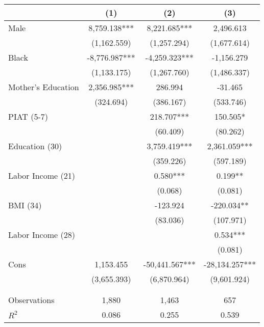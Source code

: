 \begin{tabular}{lccc} \hline
 & (1) & (2) & (3) \\ \midrule
Male & 8,759.138*** & 8,221.685*** & 2,496.613 \\
 & (1,162.559) & (1,257.294) & (1,677.614) \\
Black & -8,776.987*** & -4,259.323*** & -1,156.279 \\
 & (1,133.175) & (1,267.760) & (1,486.337) \\
Mother's Education & 2,356.985*** & 286.994 & -31.465 \\
 & (324.694) & (386.167) & (533.746) \\
PIAT (5-7) &  & 218.707*** & 150.505* \\
 &  & (60.409) & (80.262) \\
Education (30) &  & 3,759.419*** & 2,361.059*** \\
 &  & (359.226) & (597.189) \\
Labor Income (21) &  & 0.580*** & 0.199** \\
 &  & (0.068) & (0.081) \\
BMI (34) &  & -123.924 & -220.034** \\
 &  & (83.036) & (107.971) \\
Labor Income (28) &  &  & 0.534*** \\
 &  &  & (0.081) \\
Cons& 1,153.455 & -50,441.567*** & -28,134.257*** \\
 & (3,655.393) & (6,870.964) & (9,601.924) \\
 &  &  &  \\ \\ \midrule
Observations & 1,880 & 1,463 & 657 \\
$R^2$ & 0.086 & 0.255 & 0.539 \\ \bottomrule
\end{tabular}
